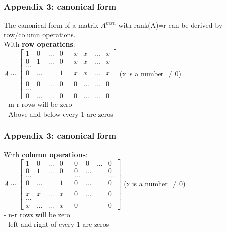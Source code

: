 \begin{frame}
	\frametitle{Appendix 3: canonical form}
	The canonical form of a matrix $A^{mxn}$ with rank(A)=r can be derived by row/column operations. \\
	With \textbf{row operations}:\\
	$A \sim \begin{bmatrix}
	1 & 0 & ... & 0 &  & x & x & ... & x\\
	0 & 1 & ... & 0 &  & x & x & ... & x\\
	...\\
	0 & ... & & 1 & & x& x& ...& x\\
	 \\
	 0 & 0 & ... & 0 & & 0 & ... &... & 0\\
	...\\
	0 & ... & ... & 0 & & 0 & ... &... & 0
	\end{bmatrix}$ (x is a number $\neq$0)\\
	- m-r rows will be zero \\
	- Above and below every 1 are zeros
\end{frame}

\begin{frame}
	\frametitle{Appendix 3: canonical form}
	With \textbf{column operations}:\\
	$A \sim \begin{bmatrix}
	1 & 0 & ... & 0 &  & 0 & 0 & ... & 0\\
	0 & 1 & ... & 0 &  & 0 & ...  &  & 0 \\
	... & & & & & ... & & & ...\\
	0 & ... & & 1 & & 0 & ... & & 0\\
	\\
	x & x & ... & x & & 0 & ... & & 0\\
	...\\
	x & ... & ... & x & & 0 & & & 0
	\end{bmatrix}$ (x is a number $\neq$0)\\
	- n-r rows will be zero \\
	- left and right of every 1 are zeros
\end{frame}